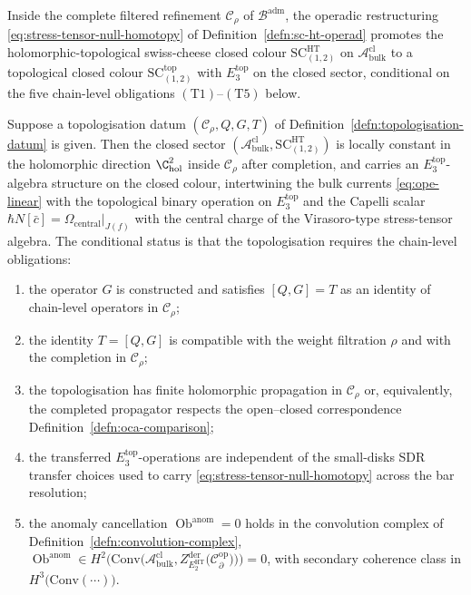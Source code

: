 \begin{thm}
\label{thm:topologisation-by-stress-tensor}
Inside the complete filtered refinement $\mathcal C_\rho$ of
$\mathcal B^{\mathrm{adm}}$, the operadic restructuring
\eqref{eq:stress-tensor-null-homotopy} of
Definition~\ref{defn:sc-ht-operad} promotes the holomorphic-topological
swiss-cheese closed colour
$\mathrm{SC}^{\mathrm{HT}}_{(1,2)}$ on
$\mathcal A^{\mathrm{cl}}_{\mathrm{bulk}}$ to a topological closed
colour $\mathrm{SC}^{\mathrm{top}}_{(1,2)}$ with $E_3^{\mathrm{top}}$
on the closed sector, conditional on the five chain-level obligations
$(\mathrm{T1})$--$(\mathrm{T5})$ below.

Suppose a topologisation datum \((\mathcal C_\rho,Q,G,T)\) of
Definition~\ref{defn:topologisation-datum} is given.  Then the closed
sector \((\mathcal A^{\mathrm{cl}}_{\mathrm{bulk}},
\mathrm{SC}^{\mathrm{HT}}_{(1,2)})\) is locally constant in the
holomorphic direction \(\C^2_{\mathrm{hol}}\) inside \(\mathcal C_\rho\)
after completion, and carries an \(E_3^{\mathrm{top}}\)-algebra
structure on the closed colour, intertwining the bulk currents
\eqref{eq:ope-linear} with the topological binary operation on
\(E_3^{\mathrm{top}}\) and the Capelli scalar
\(\hbar N[\bar c]=\Omega_{\mathrm{central}}|_{J(f)}\) with the central
charge of the Virasoro-type stress-tensor algebra.  The conditional
status is that the topologisation requires the chain-level
obligations:
\begin{enumerate}[label=\textup{(T\arabic*)}]
  \item the operator \(G\) is constructed and satisfies
        \([Q,G]=T\) as an identity of chain-level operators in
        \(\mathcal C_\rho\);
  \item the identity \(T=[Q,G]\) is compatible with the weight
        filtration \(\rho\) and with the completion in
        \(\mathcal C_\rho\);
  \item the topologisation has finite holomorphic propagation in
        \(\mathcal C_\rho\) or, equivalently, the completed propagator
        respects the open--closed correspondence
        Definition~\ref{defn:oca-comparison};
  \item the transferred \(E_3^{\mathrm{top}}\)-operations are
        independent of the small-disks SDR transfer choices used to
        carry \eqref{eq:stress-tensor-null-homotopy} across the bar
        resolution;
  \item the anomaly cancellation
        \(\operatorname{Ob}^{\mathrm{anom}}=0\) holds in the
        convolution complex of Definition~\ref{defn:convolution-complex},
        \(\operatorname{Ob}^{\mathrm{anom}}\in
        H^2\bigl(\mathrm{Conv}\!\bigl(
          \mathcal A^{\mathrm{cl}}_{\mathrm{bulk}},
          Z^{\mathrm{der}}_{E_2^{\mathrm{HT}}}\!\bigl(
            \mathcal C^{\mathrm{op}}_\partial\bigr)\bigr)\bigr)=0\),
        with secondary coherence class in
        \(H^3\bigl(\mathrm{Conv}(\cdots)\bigr)\).
\end{enumerate}
\end{thm}

